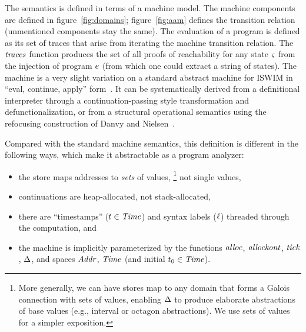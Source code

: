 \documentclass[9pt]{sigplanconf} %
\begin{document}
The semantics is defined in terms of a machine model.
%
The machine components are defined in figure~\ref{fig:domains};
%
figure~\ref{fig:aam} defines the transition relation (unmentioned components stay the same).
%
The evaluation of a program is defined as its set of traces that arise from iterating the machine transition relation.
%
The $\mathit{traces}$ function produces the set of all proofs of reachability for any state $\varsigma$ from the injection of program $e$ (from which one could extract a string of states).
%
 The machine is a very slight variation on a standard abstract machine for ISWIM in ``eval, continue, apply'' form~\cite{dvanhorn:Danvy:DSc}.
%
It can be systematically derived from a definitional interpreter through a continuation-passing style transformation and defunctionalization, or from a structural operational semantics using the refocusing construction of Danvy and Nielsen~\cite{dvanhorn:Danvy-Nielsen:RS-04-26}.

Compared with the standard machine semantics, this definition is
different in the following ways, which make it abstractable as a
program analyzer:
\begin{itemize}
\item the store maps addresses to \emph{sets} of values,
%
\footnote{
More generally, we can have stores map to any domain that forms a Galois connection with sets of values, enabling $\Delta$ to produce elaborate abstractions of base values (e.g., interval or octagon abstractions).
%
We use sets of values for a simpler exposition.
}
%
not single values,

\item continuations are heap-allocated, not stack-allocated,
%
\item there are ``timestamps'' (${t} \in \mathit{Time}$) and syntax labels (${\ell}$) threaded through the computation, and
%
\item the machine is implicitly parameterized by the functions $\mathit{alloc}$, $\mathit{allockont}$, $\mathit{tick}$, $\Delta$, and spaces $\mathit{Addr}$, $\mathit{Time}$ (and initial ${t}_0 \in \mathit{Time}$).
\end{itemize}
\end{document}
